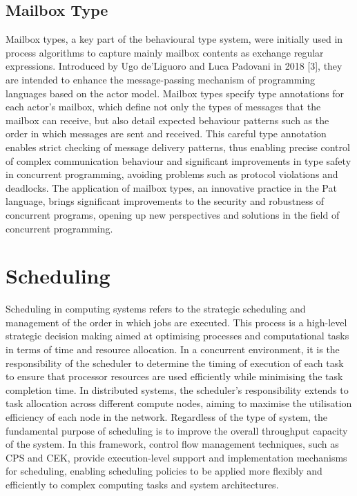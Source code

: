 \documentclass{l4proj}
\begin{document}
\subsection{Mailbox Type}
Mailbox types, a key part of the behavioural type system, were initially used in process algorithms to capture mainly mailbox contents as exchange regular expressions. Introduced by Ugo de'Liguoro and Luca Padovani in 2018 [3], they are intended to enhance the message-passing mechanism of programming languages based on the actor model. Mailbox types specify type annotations for each actor's mailbox, which define not only the types of messages that the mailbox can receive, but also detail expected behaviour patterns such as the order in which messages are sent and received. This careful type annotation enables strict checking of message delivery patterns, thus enabling precise control of complex communication behaviour and significant improvements in type safety in concurrent programming, avoiding problems such as protocol violations and deadlocks. The application of mailbox types, an innovative practice in the Pat language, brings significant improvements to the security and robustness of concurrent programs, opening up new perspectives and solutions in the field of concurrent programming.


\section{Scheduling}
Scheduling in computing systems refers to the strategic scheduling and management of the order in which jobs are executed. This process is a high-level strategic decision making aimed at optimising processes and computational tasks in terms of time and resource allocation. In a concurrent environment, it is the responsibility of the scheduler to determine the timing of execution of each task to ensure that processor resources are used efficiently while minimising the task completion time. In distributed systems, the scheduler's responsibility extends to task allocation across different compute nodes, aiming to maximise the utilisation efficiency of each node in the network. Regardless of the type of system, the fundamental purpose of scheduling is to improve the overall throughput capacity of the system. In this framework, control flow management techniques, such as CPS and CEK, provide execution-level support and implementation mechanisms for scheduling, enabling scheduling policies to be applied more flexibly and efficiently to complex computing tasks and system architectures.
\end{document}
